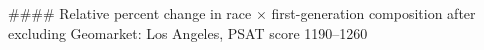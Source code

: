#### Relative percent change in race × first-generation composition after excluding Geomarket: Los Angeles, PSAT score 1190–1260
